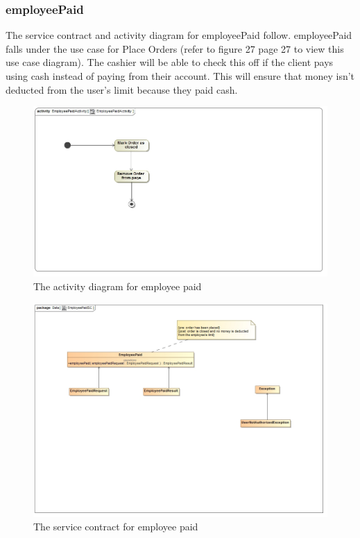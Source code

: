 \documentclass[a4paper,12pt]{report}
\begin{document}
\subsubsection{employeePaid}
The service contract and activity diagram for employeePaid follow. employeePaid falls under the use case for Place Orders (refer to figure 27 page 27 to view this use case diagram). The cashier will be able to check this off if the client pays using cash instead of paying from their account. This will ensure that money isn't deducted from the user's limit because they paid cash. 
\begin{figure}[H]
  \centering
    \includegraphics[width=1.0\textwidth]{../images/EmployeePaidActivity.jpg}
    \caption{The activity diagram for employee paid} 
\end{figure}

\begin{figure}[H]
	\centering
	\includegraphics[width=1.0\textwidth]{../images/EmployeePaidSC.jpg}
	\caption{The service contract for employee paid}
\end{figure}
\end{document}
